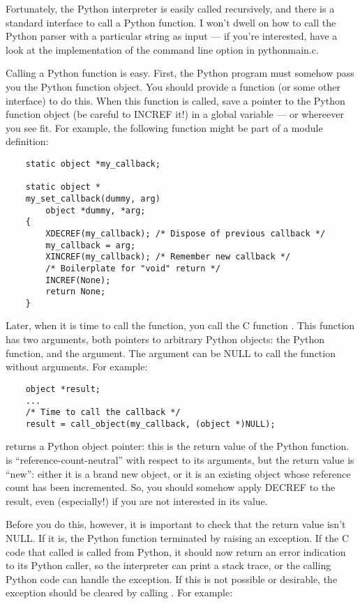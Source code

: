 Fortunately, the Python interpreter is easily called recursively, and
there is a standard interface to call a Python function.  I won't
dwell on how to call the Python parser with a particular string as
input --- if you're interested, have a look at the implementation of
the  command line option in pythonmain.c.

Calling a Python function is easy.  First, the Python program must
somehow pass you the Python function object.  You should provide a
function (or some other interface) to do this.  When this function is
called, save a pointer to the Python function object (be careful to
INCREF it!) in a global variable --- or whereever you see fit.
For example, the following function might be part of a module
definition:

\begin{verbatim}
    static object *my_callback;

    static object *
    my_set_callback(dummy, arg)
        object *dummy, *arg;
    {
        XDECREF(my_callback); /* Dispose of previous callback */
        my_callback = arg;
        XINCREF(my_callback); /* Remember new callback */
        /* Boilerplate for "void" return */
        INCREF(None);
        return None;
    }
\end{verbatim}

Later, when it is time to call the function, you call the C function
.  This function has two arguments, both pointers
to arbitrary Python objects: the Python function, and the argument.
The argument can be NULL to call the function without arguments.  For
example:

\begin{verbatim}
    object *result;
    ...
    /* Time to call the callback */
    result = call_object(my_callback, (object *)NULL);
\end{verbatim}

 returns a Python object pointer: this is
the return value of the Python function.   is
``reference-count-neutral'' with respect to its arguments, but the
return value is ``new'': either it is a brand new object, or it is an
existing object whose reference count has been incremented.  So, you
should somehow apply DECREF to the result, even (especially!) if you
are not interested in its value.

Before you do this, however, it is important to check that the return
value isn't NULL.  If it is, the Python function terminated by raising
an exception.  If the C code that called  is
called from Python, it should now return an error indication to its
Python caller, so the interpreter can print a stack trace, or the
calling Python code can handle the exception.  If this is not possible
or desirable, the exception should be cleared by calling
.  For example:

